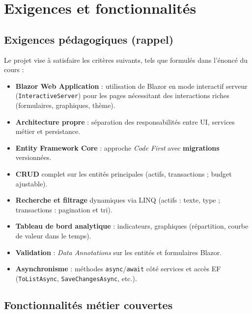 \chapter{Exigences et fonctionnalités}
\label{ch:exigences}

\section{Exigences pédagogiques (rappel)}

Le projet vise à satisfaire les critères suivants, tels que formulés dans l'énoncé du cours :
\begin{itemize}[leftmargin=*]
  \item \textbf{Blazor Web Application} : utilisation de Blazor en mode interactif serveur (\texttt{InteractiveServer}) pour les pages nécessitant des interactions riches (formulaires, graphiques, thème).
  \item \textbf{Architecture propre} : séparation des responsabilités entre UI, services métier et persistance.
  \item \textbf{Entity Framework Core} : approche \emph{Code First} avec \textbf{migrations} versionnées.
  \item \textbf{CRUD} complet sur les entités principales (actifs, transactions ; budget ajustable).
  \item \textbf{Recherche et filtrage} dynamiques via LINQ (actifs : texte, type ; transactions : pagination et tri).
  \item \textbf{Tableau de bord analytique} : indicateurs, graphiques (répartition, courbe de valeur dans le temps).
  \item \textbf{Validation} : \emph{Data Annotations} sur les entités et formulaires Blazor.
  \item \textbf{Asynchronisme} : méthodes \texttt{async}/\texttt{await} côté services et accès EF (\texttt{ToListAsync}, \texttt{SaveChangesAsync}, etc.).
\end{itemize}

\section{Fonctionnalités métier couvertes}

